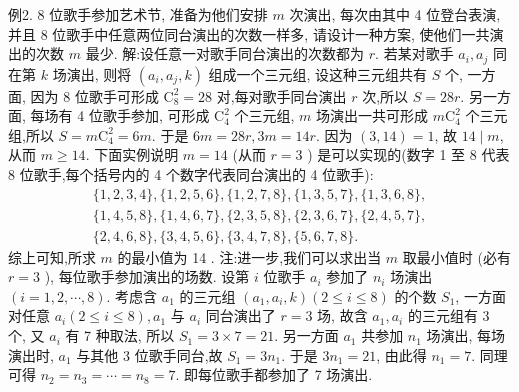 例2. 8 位歌手参加艺术节, 准备为他们安排 $m$ 次演出, 每次由其中 4 位登台表演, 并且 8 位歌手中任意两位同台演出的次数一样多, 请设计一种方案, 使他们一共演出的次数 $m$ 最少.
解:设任意一对歌手同台演出的次数都为 $r$. 若某对歌手 $a_i, a_j$ 同在第 $k$ 场演出, 则将 $\left(a_i, a_j, k\right)$ 组成一个三元组, 设这种三元组共有 $S$ 个, 一方面, 因为 8 位歌手可形成 $\mathrm{C}_8^2=28$ 对,每对歌手同台演出 $r$ 次,所以 $S=28 r$.
另一方面, 每场有 4 位歌手参加, 可形成 $\mathrm{C}_4^2$ 个三元组, $m$ 场演出一共可形成 $m \mathrm{C}_4^2$ 个三元组,所以 $S=m \mathrm{C}_4^2=6 m$. 于是 $6 m=28 r, 3 m=14 r$.
因为 $(3,14)=1$, 故 $14 \mid m$, 从而 $m \geqslant 14$.
下面实例说明 $m=14$ (从而 $r=3$ ) 是可以实现的(数字 1 至 8 代表 8 位歌手,每个括号内的 4 个数字代表同台演出的 4 位歌手):
$$
\begin{gathered}
\{1,2,3,4\},\{1,2,5,6\},\{1,2,7,8\},\{1,3,5,7\},\{1,3,6,8\}, \\
\{1,4,5,8\},\{1,4,6,7\},\{2,3,5,8\},\{2,3,6,7\},\{2,4,5,7\}, \\
\{2,4,6,8\},\{3,4,5,6\},\{3,4,7,8\},\{5,6,7,8\} .
\end{gathered}
$$
综上可知,所求 $m$ 的最小值为 14 .
注:进一步,我们可以求出当 $m$ 取最小值时 (必有 $r=3$ ), 每位歌手参加演出的场数.
设第 $i$ 位歌手 $a_i$ 参加了 $n_i$ 场演出 $(i=1,2, \cdots, 8)$. 考虑含 $a_1$ 的三元组 $\left(a_1, a_i, k\right)(2 \leqslant i \leqslant 8)$ 的个数 $S_1$, 一方面对任意 $a_i(2 \leqslant i \leqslant 8), a_1$ 与 $a_i$ 同台演出了 $r=3$ 场, 故含 $a_1, a_i$ 的三元组有 3 个, 又 $a_i$ 有 7 种取法, 所以 $S_1=3 \times 7=21$. 另一方面 $a_1$ 共参加 $n_1$ 场演出, 每场演出时, $a_1$ 与其他 3 位歌手同台,故 $S_1=3 n_1$. 于是 $3 n_1=21$, 由此得 $n_1=7$. 同理可得 $n_2=n_3= \cdots=n_8=7$. 即每位歌手都参加了 7 场演出.



